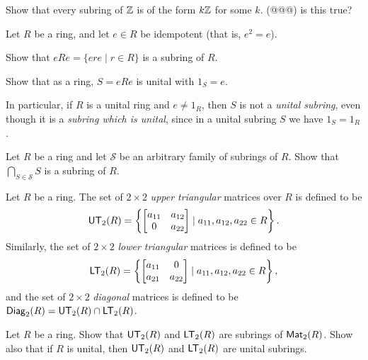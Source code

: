 \begin{exercise}
Show that every subring of \(\mathbb{Z}\) is of the form \(k\mathbb{Z}\) for some \(k\).
(@@@) is this true?
\end{exercise}

\begin{exercise}
Let \(R\) be a ring, and let \(e \in R\) be idempotent (that is, \(e^2 = e\)).
\begin{proplist*}
\item Show that \(eRe = \{ ere \mid r \in R \}\) is a subring of \(R\).
\item Show that as a ring, \(S = eRe\) is unital with \(1_S = e\).
\end{proplist*}
In particular, if \(R\) is a unital ring and \(e \neq 1_R\), then \(S\) is not a \emph{unital subring}, even though it is a \emph{subring which is unital}, since in a unital subring \(S\) we have \(1_S = 1_R\).
\end{exercise}

\begin{exercise}
Let \(R\) be a ring and let \(\mathcal{S}\) be an arbitrary family of subrings of \(R\).
Show that \(\bigcap_{S \in \mathcal{S}} S\) is a subring of \(R\).
\end{exercise}

\begin{dfn} \label{dfn:triangular-diagonal-matrix}
Let \(R\) be a ring.
The set of \(2 \times 2\) \emph{upper triangular} matrices over \(R\) is defined to be \[ \mathsf{UT}_{2}(R) = \left\{ \begin{bmatrix} a_{11} & a_{12} \\ 0 & a_{22} \end{bmatrix} \mid a_{11}, a_{12}, a_{22} \in R \right\}. \] Similarly, the set of \(2 \times 2\) \emph{lower triangular} matrices is defined to be \[ \mathsf{LT}_{2}(R) = \left\{ \begin{bmatrix} a_{11} & 0 \\ a_{21} & a_{22} \end{bmatrix} \mid a_{11}, a_{12}, a_{22} \in R \right\}, \] and the set of \(2 \times 2\) \emph{diagonal} matrices is defined to be \(\mathsf{Diag}_{2}(R) = \mathsf{UT}_{2}(R) \cap \mathsf{LT}_{2}(R)\).
\end{dfn}

\begin{exercise}
Let \(R\) be a ring.
Show that \(\mathsf{UT}_{2}(R)\) and \(\mathsf{LT}_{2}(R)\) are subrings of \(\mathsf{Mat}_{2}(R)\).
Show also that if \(R\) is unital, then \(\mathsf{UT}_{2}(R)\) and \(\mathsf{LT}_{2}(R)\) are unital subrings.
\end{exercise}

